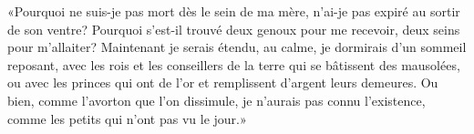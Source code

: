 «Pourquoi ne suis-je pas mort dès le sein de ma mère,
	n’ai-je pas expiré au sortir de son ventre?
Pourquoi s’est-il trouvé deux genoux pour me recevoir, deux seins pour m’allaiter?
Maintenant je serais étendu, au calme, je dormirais d’un sommeil reposant,
	avec les rois et les conseillers de la terre qui se bâtissent des mausolées,
	ou avec les princes qui ont de l’or et remplissent d’argent leurs demeures.
Ou bien, comme l’avorton que l’on dissimule, je n’aurais pas connu l’existence,
	comme les petits qui n’ont pas vu le jour.»

